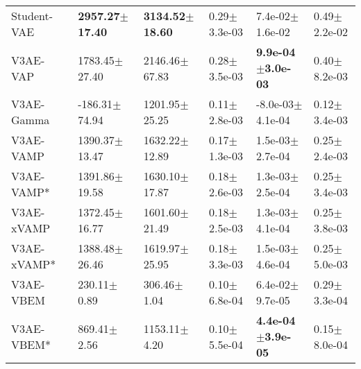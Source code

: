 \begin{tabular}{llllll}
Student-VAE            &  \textbf{2957.27$\pm$17.40} &  \textbf{3134.52$\pm$18.60} &              0.29$\pm$3.3e-03 &           7.4e-02$\pm$1.6e-02 &              0.49$\pm$2.2e-02 \\
V3AE-VAP               &           1783.45$\pm$27.40 &           2146.46$\pm$67.83 &              0.28$\pm$3.5e-03 &  \textbf{9.9e-04$\pm$3.0e-03} &              0.40$\pm$8.2e-03 \\
V3AE-Gamma             &           -186.31$\pm$74.94 &           1201.95$\pm$25.25 &              0.11$\pm$2.8e-03 &          -8.0e-03$\pm$4.1e-04 &              0.12$\pm$3.4e-03 \\
V3AE-VAMP              &           1390.37$\pm$13.47 &           1632.22$\pm$12.89 &              0.17$\pm$1.3e-03 &           1.5e-03$\pm$2.7e-04 &              0.25$\pm$2.4e-03 \\
V3AE-VAMP*             &           1391.86$\pm$19.58 &           1630.10$\pm$17.87 &              0.18$\pm$2.6e-03 &           1.3e-03$\pm$2.5e-04 &              0.25$\pm$3.4e-03 \\
V3AE-xVAMP             &           1372.45$\pm$16.77 &           1601.60$\pm$21.49 &              0.18$\pm$2.5e-03 &           1.3e-03$\pm$4.1e-04 &              0.25$\pm$3.8e-03 \\
V3AE-xVAMP*            &           1388.48$\pm$26.46 &           1619.97$\pm$25.95 &              0.18$\pm$3.3e-03 &           1.5e-03$\pm$4.6e-04 &              0.25$\pm$5.0e-03 \\
V3AE-VBEM              &             230.11$\pm$0.89 &             306.46$\pm$1.04 &              0.10$\pm$6.8e-04 &           6.4e-02$\pm$9.7e-05 &              0.29$\pm$3.3e-04 \\
V3AE-VBEM*             &             869.41$\pm$2.56 &            1153.11$\pm$4.20 &              0.10$\pm$5.5e-04 &  \textbf{4.4e-04$\pm$3.9e-05} &              0.15$\pm$8.0e-04 \\
\bottomrule
\end{tabular}

